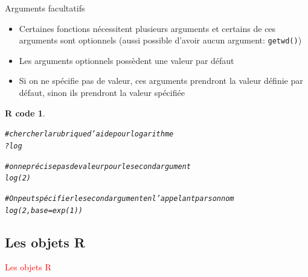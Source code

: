 \documentclass[11pt]{beamer}\usepackage[]{graphicx}\usepackage[]{color}
\makeatletter
\newcommand{\hlnum}[1]{\textcolor[rgb]{0.063,0.58,0.627}{#1}}%
\newcommand{\hlcom}[1]{\textcolor[rgb]{0.588,0.588,0.588}{#1}}%
\newcommand{\hlopt}[1]{\textcolor[rgb]{0.196,0.196,0.196}{#1}}%
\newcommand{\hlstd}[1]{\textcolor[rgb]{0.196,0.196,0.196}{#1}}%
\newcommand{\hlkwc}[1]{\textcolor[rgb]{0,0.631,0.314}{#1}}%
\newcommand{\hlkwd}[1]{\textcolor[rgb]{0.78,0.227,0.412}{#1}}%
\newenvironment{kframe}{%
 \def\at@end@of@kframe{}%
 \ifinner\ifhmode%
  \def\at@end@of@kframe{\end{minipage}}%
  \begin{minipage}{\columnwidth}%
 \fi\fi%
 \def\FrameCommand##1{\hskip\@totalleftmargin \hskip-\fboxsep
 \colorbox{shadecolor}{##1}\hskip-\fboxsep
     \hskip-\linewidth \hskip-\@totalleftmargin \hskip\columnwidth}%
 \MakeFramed {\advance\hsize-\width
   \@totalleftmargin\z@ \linewidth\hsize
   \@setminipage}}%
 {\par\unskip\endMakeFramed%
 \at@end@of@kframe}
\newenvironment{knitrout}{}{} %
\newtheorem{rcode}{R code}[section]
\newcommand{\code}[1]{\texttt{#1}}
\makeatother
\begin{document}
\begin{frame}[fragile]{Arguments facultatifs}
\begin{itemize}
 \setlength\itemsep{0.5em}
\item Certaines fonctions nécessitent plusieurs arguments et certains de ces arguments sont optionnels (aussi possible d'avoir aucun argument: \code{getwd()}) 
\pause \item Les arguments optionnels possèdent une valeur par défaut
\pause \item Si on ne spécifie pas de valeur, ces arguments prendront la valeur définie par défaut, sinon ils prendront la valeur spécifiée
\end{itemize}
\pause 

\begin{knitrout}\footnotesize
{}\color{fgcolor}\begin{kframe}
\begin{rcode}\label{unnamed-chunk-11}\begin{alltt}
\hlcom{# chercher la rubrique d'aide pour logarithme}
\hlopt{?}\hlstd{log}

\hlcom{# on ne précise pas de valeur pour le second argument}
\hlkwd{log}\hlstd{(}\hlnum{2}\hlstd{)}

\hlcom{# On peut spécifier le second argument en l'appelant par son nom}
\hlkwd{log}\hlstd{(}\hlnum{2}\hlstd{,} \hlkwc{base} \hlstd{=} \hlkwd{exp}\hlstd{(}\hlnum{1}\hlstd{))}
\end{alltt}
\end{rcode}\end{kframe}
\end{knitrout}

\end{frame}




\subsection{Les objets R}

\begin{frame}
 \begin{center}
  \Huge{\textcolor{red}{Les objets R}}
 \end{center}
\end{frame}


\end{document}
